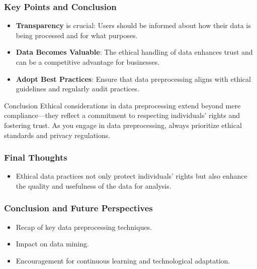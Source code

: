 \documentclass{beamer}
\begin{document}
\begin{frame}[fragile]
    \frametitle{Key Points and Conclusion}
    \begin{itemize}
        \item \textbf{Transparency} is crucial: Users should be informed about how their data is being processed and for what purposes.
        \item \textbf{Data Becomes Valuable}: The ethical handling of data enhances trust and can be a competitive advantage for businesses.
        \item \textbf{Adopt Best Practices}: Ensure that data preprocessing aligns with ethical guidelines and regularly audit practices.
    \end{itemize}
    \begin{block}{Conclusion}
        Ethical considerations in data preprocessing extend beyond mere compliance—they reflect a commitment to respecting individuals’ rights and fostering trust. As you engage in data preprocessing, always prioritize ethical standards and privacy regulations.
    \end{block}
\end{frame}

\begin{frame}[fragile]
    \frametitle{Final Thoughts}
    \begin{itemize}
        \item Ethical data practices not only protect individuals' rights but also enhance the quality and usefulness of the data for analysis.
    \end{itemize}
\end{frame}

\begin{frame}[fragile]
    \frametitle{Conclusion and Future Perspectives}
    \begin{itemize}
        \item Recap of key data preprocessing techniques.
        \item Impact on data mining.
        \item Encouragement for continuous learning and technological adaptation.
    \end{itemize}
\end{frame}
\end{document}
